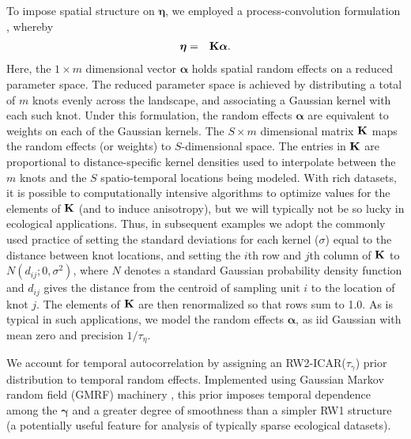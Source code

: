 \documentclass[12pt,fleqn]{article}
\begin{document}
\begin{flushleft}
\hspace{.5in} To impose spatial structure on $\boldsymbol{\eta}$, we employed a process-convolution formulation \citep[see e.g.][]{Higdon1998,CalderEtAl2002}, whereby
\begin{eqnarray}
   \boldsymbol{\eta} & = & {\bf K} \boldsymbol{\alpha}.
 \label{eq:reduced-spat}
\end{eqnarray}
Here, the $1 \times m$ dimensional vector $\boldsymbol{\alpha}$ holds spatial random effects on a reduced parameter space.  The reduced parameter space is achieved by distributing a total of $m$ knots evenly across the landscape, and associating a Gaussian kernel with each such knot. Under this formulation, the random effects $\boldsymbol{\alpha}$ are equivalent to weights on each of the Gaussian kernels.  The $S \times m$ dimensional matrix ${\bf K}$ maps the random effects (or weights) to $S$-dimensional space.  The entries in ${\bf K}$ are proportional to distance-specific kernel densities used to interpolate between the $m$ knots and the $S$ spatio-temporal locations being modeled.  With rich datasets, it is possible to computationally intensive algorithms to optimize values for the elements of ${\bf K}$ (and to induce anisotropy), but we will typically not be so lucky in ecological applications.  Thus, in subsequent examples we adopt the commonly used practice of setting the standard deviations for each kernel ($\sigma$) equal to the distance between knot locations, and setting the $i$th row and $j$th column of ${\bf K}$ to $N(d_{ij}; 0,\sigma^2)$, where $N$ denotes a standard Gaussian probability density function and $d_{ij}$ gives the distance from the centroid of sampling unit $i$ to the location of knot $j$.  The elements of ${\bf K}$ are then renormalized so that rows sum to 1.0.
As is typical in such applications, we model the random effects $\boldsymbol{\alpha}$, as iid Gaussian with mean zero and precision $1/\tau_\eta$.

\hspace{.5in} We account for temporal autocorrelation by assigning an RW2-ICAR($\tau_\gamma$) prior distribution \citep[see e.g.][section 3.4]{RueHeld2005} to temporal random effects.  Implemented using Gaussian Markov random field (GMRF) machinery \citep[again see][for a thorough treatment]{RueHeld2005}, this prior imposes temporal dependence among the $\boldsymbol{\gamma}$  and a greater degree of smoothness than a simpler RW1 structure (a potentially useful feature for analysis of typically sparse ecological datasets).


\end{flushleft}
\end{document}
